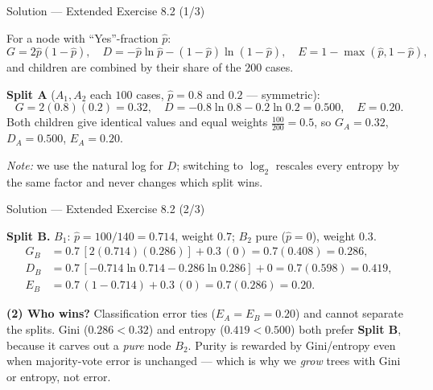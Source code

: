 \documentclass[aspectratio=169,11pt]{beamer}
\begin{document}
\begin{frame}{Solution --- Extended Exercise 8.2 (1/3)}
\begin{solutionbox}
For a node with ``Yes''-fraction $\hat p$:
\[ G=2\hat p(1-\hat p),\quad D=-\hat p\ln\hat p-(1-\hat p)\ln(1-\hat p),\quad E=1-\max(\hat p,1-\hat p), \]
and children are combined by their share of the $200$ cases.

\medskip
\textbf{Split A} ($A_1,A_2$ each $100$ cases, $\hat p=0.8$ and $0.2$ --- symmetric):
\[ G=2(0.8)(0.2)=0.32,\quad D=-0.8\ln0.8-0.2\ln0.2=0.500,\quad E=0.20. \]
Both children give identical values and equal weights $\tfrac{100}{200}=0.5$, so $G_A=0.32$, $D_A=0.500$, $E_A=0.20$.

\medskip
\emph{Note:} we use the natural log for $D$; switching to $\log_2$ rescales every entropy by the same factor and never changes which split wins.
\end{solutionbox}
\end{frame}

\begin{frame}{Solution --- Extended Exercise 8.2 (2/3)}
\begin{solutionbox}
\textbf{Split B.} $B_1$: $\hat p=100/140=0.714$, weight $0.7$; $B_2$ pure ($\hat p=0$), weight $0.3$.
\begin{align*}
G_B&=0.7\,[2(0.714)(0.286)]+0.3\,(0)=0.7(0.408)=\mathbf{0.286},\\
D_B&=0.7\,[-0.714\ln0.714-0.286\ln0.286]+0=0.7(0.598)=\mathbf{0.419},\\
E_B&=0.7\,(1-0.714)+0.3\,(0)=0.7(0.286)=\mathbf{0.20}.
\end{align*}

\medskip
\textbf{(2) Who wins?} Classification error ties ($E_A=E_B=0.20$) and cannot separate the splits. Gini ($0.286<0.32$) and entropy ($0.419<0.500$) both prefer \textbf{Split B}, because it carves out a \emph{pure} node $B_2$. Purity is rewarded by Gini/entropy even when majority-vote error is unchanged --- which is why we \emph{grow} trees with Gini or entropy, not error.
\end{solutionbox}
\end{frame}
\end{document}
